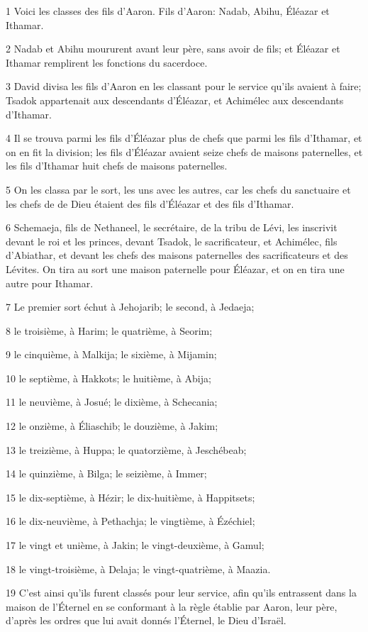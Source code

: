 \par 1 Voici les classes des fils d'Aaron. Fils d'Aaron: Nadab, Abihu, Éléazar et Ithamar.
\par 2 Nadab et Abihu moururent avant leur père, sans avoir de fils; et Éléazar et Ithamar remplirent les fonctions du sacerdoce.
\par 3 David divisa les fils d'Aaron en les classant pour le service qu'ils avaient à faire; Tsadok appartenait aux descendants d'Éléazar, et Achimélec aux descendants d'Ithamar.
\par 4 Il se trouva parmi les fils d'Éléazar plus de chefs que parmi les fils d'Ithamar, et on en fit la division; les fils d'Éléazar avaient seize chefs de maisons paternelles, et les fils d'Ithamar huit chefs de maisons paternelles.
\par 5 On les classa par le sort, les uns avec les autres, car les chefs du sanctuaire et les chefs de de Dieu étaient des fils d'Éléazar et des fils d'Ithamar.
\par 6 Schemaeja, fils de Nethaneel, le secrétaire, de la tribu de Lévi, les inscrivit devant le roi et les princes, devant Tsadok, le sacrificateur, et Achimélec, fils d'Abiathar, et devant les chefs des maisons paternelles des sacrificateurs et des Lévites. On tira au sort une maison paternelle pour Éléazar, et on en tira une autre pour Ithamar.
\par 7 Le premier sort échut à Jehojarib; le second, à Jedaeja;
\par 8 le troisième, à Harim; le quatrième, à Seorim;
\par 9 le cinquième, à Malkija; le sixième, à Mijamin;
\par 10 le septième, à Hakkots; le huitième, à Abija;
\par 11 le neuvième, à Josué; le dixième, à Schecania;
\par 12 le onzième, à Éliaschib; le douzième, à Jakim;
\par 13 le treizième, à Huppa; le quatorzième, à Jeschébeab;
\par 14 le quinzième, à Bilga; le seizième, à Immer;
\par 15 le dix-septième, à Hézir; le dix-huitième, à Happitsets;
\par 16 le dix-neuvième, à Pethachja; le vingtième, à Ézéchiel;
\par 17 le vingt et unième, à Jakin; le vingt-deuxième, à Gamul;
\par 18 le vingt-troisième, à Delaja; le vingt-quatrième, à Maazia.
\par 19 C'est ainsi qu'ils furent classés pour leur service, afin qu'ils entrassent dans la maison de l'Éternel en se conformant à la règle établie par Aaron, leur père, d'après les ordres que lui avait donnés l'Éternel, le Dieu d'Israël.
